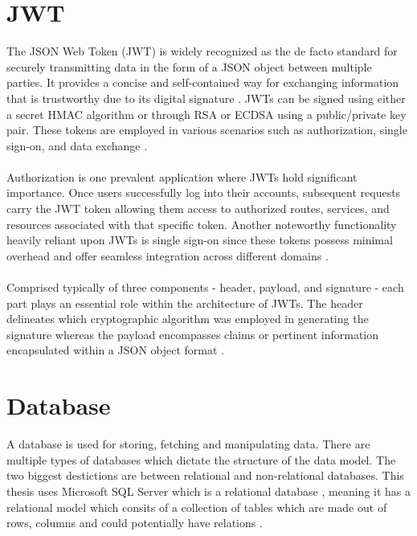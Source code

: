 \documentclass[BIF,Bachelor,nenglish]{twbook}%
\begin{document}
\section{JWT}
The JSON Web Token (JWT) is widely recognized as the de facto standard for securely transmitting data in the form of a JSON object between multiple parties. It provides a concise and self-contained way for exchanging information that is trustworthy due to its digital signature \cite{akanajwt}. JWTs can be signed using either a secret HMAC algorithm or through RSA or ECDSA using a public/private key pair. These tokens are employed in various scenarios such as authorization, single sign-on, and data exchange \cite{oauthjwt}.
\\
\\
Authorization is one prevalent application where JWTs hold significant importance. Once users successfully log into their accounts, subsequent requests carry the JWT token allowing them access to authorized routes, services, and resources associated with that specific token. Another noteworthy functionality heavily reliant upon JWTs is single sign-on since these tokens possess minimal overhead and offer seamless integration across different domains \cite{jwt, oauthjwt}.
\\
\\
Comprised typically of three components - header, payload, and signature - each part plays an essential role within the architecture of JWTs. The header delineates which cryptographic algorithm was employed in generating the signature whereas the payload encompasses claims or pertinent information encapsulated within a JSON object format \cite{superjwt}.

\section{Database}
A database is used for storing, fetching and manipulating data. There are multiple types of databases which dictate the structure of the data model. The two biggest destictions are between relational and non-relational databases. This thesis uses Microsoft SQL Server which is a relational database \cite{whatmsSQLdb}, meaning it has a relational model which consits of a collection of tables which are made out of rows, columns and could potentially have relations \cite{oraclereldb, ibmreldb}.
\end{document}
